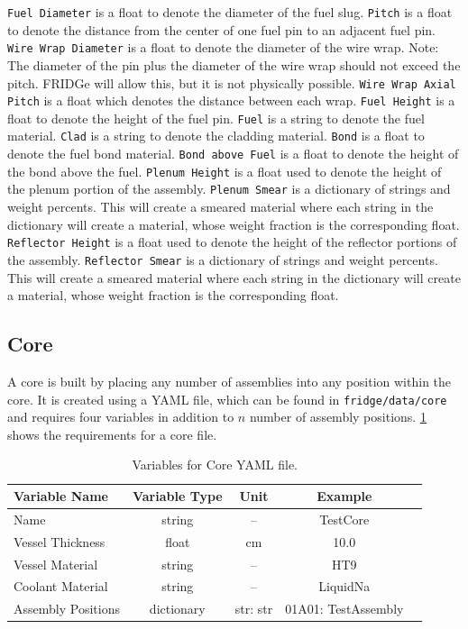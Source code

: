 \documentclass{article}
\begin{document}
\verb|Fuel Diameter| is a float to denote the diameter of the fuel slug. \verb|Pitch| is a float to denote the distance from the center of one fuel pin to an adjacent fuel pin. \verb|Wire Wrap Diameter| is a float to denote the diameter of the wire wrap. Note: The diameter of the pin plus the diameter of the wire wrap should not exceed the pitch. FRIDGe will allow this, but it is not physically possible. \verb|Wire Wrap Axial Pitch| is a float which denotes the distance between each wrap. \verb|Fuel Height| is a float to denote the height of the fuel pin. \verb|Fuel| is a string to denote the fuel material. \verb|Clad| is a string to denote the cladding material. \verb|Bond| is a float to denote the fuel bond material. \verb|Bond above Fuel| is a float to denote the height of the bond above the fuel. 
\verb|Plenum Height| is a float used to denote the height of the plenum portion of the assembly.  \verb|Plenum Smear| is a dictionary of strings and weight percents. This will create a smeared material where each string in the dictionary will create a material, whose weight fraction is the corresponding float. \verb|Reflector Height| is a float used to denote the height of the reflector portions of the assembly.  \verb|Reflector Smear| is a dictionary of strings and weight percents. This will create a smeared material where each string in the dictionary will create a material, whose weight fraction is the corresponding float.

\subsection{Core}

A core is built by placing any number of assemblies into any position within the core. It is created using a YAML file, which can be found in \verb|fridge/data/core| and requires four variables in addition to $n$ number of assembly positions. \ref{tab:core} shows the requirements for a core file.

\begin{table}
	\centering
	\caption{Variables for Core YAML file.}
	\begin{tabular}{lcccc}\toprule
		Variable Name   & Variable Type & Unit & Example 
		\\
		\hline
    	Name  & string & -- & TestCore
		\\
		Vessel Thickness & float & cm & 10.0
		\\		
		Vessel Material & string & -- & HT9
		\\
		Coolant Material & string & -- & LiquidNa
		\\
	    Assembly Positions & dictionary & str: str & 01A01: TestAssembly
		\\
		\bottomrule
	\end{tabular}
	\label{tab:core}
\end{table}
\end{document}
